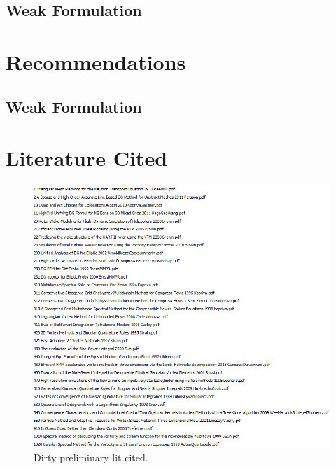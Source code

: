 \documentclass[letterpaper,12pt]{report}
\begin{document}
\subsection{Weak Formulation}
\section{Recommendations}
\subsection{Weak Formulation}
\section{Literature Cited}
\begin{figure}
\centering
\includegraphics[width=1.4\textwidth]{LitStart.PNG}
\caption{\label{fig:ring}Dirty preliminary lit cited.}
\end{figure}
\end{document}
